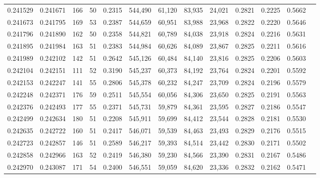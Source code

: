 \begin{tabular}{rrrrrrrrrrrrr}
0.241529 & 0.241671 &   166 &  50 &                                     0.2315 & 544,490 &  61,120 &  83,935 &  24,021 & 0.2821 & 0.2225 & 0.5662 \\
0.241673 & 0.241795 &   169 &  53 &                                     0.2387 & 544,659 &  60,951 &  83,988 &  23,968 & 0.2822 & 0.2220 & 0.5646 \\
0.241796 & 0.241890 &   162 &  50 &                                     0.2358 & 544,821 &  60,789 &  84,038 &  23,918 & 0.2824 & 0.2216 & 0.5631 \\
0.241895 & 0.241984 &   163 &  51 &                                     0.2383 & 544,984 &  60,626 &  84,089 &  23,867 & 0.2825 & 0.2211 & 0.5616 \\
0.241989 & 0.242102 &   142 &  51 &                                     0.2642 & 545,126 &  60,484 &  84,140 &  23,816 & 0.2825 & 0.2206 & 0.5603 \\
0.242104 & 0.242151 &   111 &  52 &                                     0.3190 & 545,237 &  60,373 &  84,192 &  23,764 & 0.2824 & 0.2201 & 0.5592 \\
0.242153 & 0.242247 &   141 &  55 &                                     0.2806 & 545,378 &  60,232 &  84,247 &  23,709 & 0.2824 & 0.2196 & 0.5579 \\
0.242248 & 0.242371 &   176 &  59 &                                     0.2511 & 545,554 &  60,056 &  84,306 &  23,650 & 0.2825 & 0.2191 & 0.5563 \\
0.242376 & 0.242493 &   177 &  55 &                                     0.2371 & 545,731 &  59,879 &  84,361 &  23,595 & 0.2827 & 0.2186 & 0.5547 \\
0.242499 & 0.242634 &   180 &  51 &                                     0.2208 & 545,911 &  59,699 &  84,412 &  23,544 & 0.2828 & 0.2181 & 0.5530 \\
0.242635 & 0.242722 &   160 &  51 &                                     0.2417 & 546,071 &  59,539 &  84,463 &  23,493 & 0.2829 & 0.2176 & 0.5515 \\
0.242723 & 0.242857 &   146 &  51 &                                     0.2589 & 546,217 &  59,393 &  84,514 &  23,442 & 0.2830 & 0.2171 & 0.5502 \\
0.242858 & 0.242966 &   163 &  52 &                                     0.2419 & 546,380 &  59,230 &  84,566 &  23,390 & 0.2831 & 0.2167 & 0.5486 \\
0.242970 & 0.243087 &   171 &  54 &                                     0.2400 & 546,551 &  59,059 &  84,620 &  23,336 & 0.2832 & 0.2162 & 0.5471 \\

\end{tabular}
